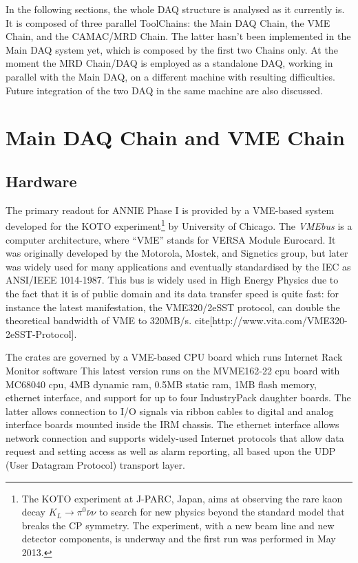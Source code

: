 In the following sections, the whole DAQ structure is analysed as it currently is.
It is composed of three parallel ToolChains: the Main DAQ Chain, the VME Chain, and %
the CAMAC/MRD Chain.
The latter hasn't been implemented in the Main DAQ system yet, which is composed by the %
first two Chains only.
At the moment the MRD Chain/DAQ is employed as a standalone DAQ, working in parallel %
with the Main DAQ, on a different machine with resulting difficulties.
Future integration of the two DAQ in the same machine are also discussed.

\section{Main DAQ Chain and VME Chain}
\label{sec:3.1}

\subsection{Hardware}

The primary readout for ANNIE Phase I is provided by a VME-based system developed for the KOTO %
experiment\footnote{The KOTO experiment at J-PARC, Japan, aims at observing the rare kaon decay %
  $K_L\rightarrow \pi^0 \bar{\nu} \nu$ to search for new physics beyond the standard model that %
  breaks the CP symmetry. The experiment, with a new beam line and new detector components, is %
  underway and the first run was performed in May 2013.} %
by University of Chicago.
The \emph{VMEbus} is a computer architecture, where ``VME'' stands for VERSA Module Eurocard.
It was originally developed by the Motorola, Mostek, and Signetics group, but later was widely %
used for many applications and eventually standardised by the IEC as ANSI/IEEE 1014-1987.
This bus is widely used in High Energy Physics due to the fact that it is of public domain and %
its data transfer speed is quite fast: for instance the latest manifestation, %
the VME320/2eSST protocol, can double the theoretical bandwidth of VME to 320MB/s.
cite[http://www.vita.com/VME320-2eSST-Protocol].

The crates are governed by a VME-based CPU board which runs Internet Rack Monitor software
This latest version runs on the MVME162-22 cpu board with MC68040 cpu, 4MB dynamic ram, %
0.5MB static ram, 1MB flash memory, ethernet interface, and support for up to four %
IndustryPack daughter boards. 
The latter allows connection to I/O signals via ribbon cables to digital and %
analog interface boards mounted inside the IRM chassis. 
The ethernet interface allows network connection and supports widely-used %
Internet protocols that allow data request and setting access as well as alarm reporting, %
all based upon the UDP (User Datagram Protocol) transport layer.

